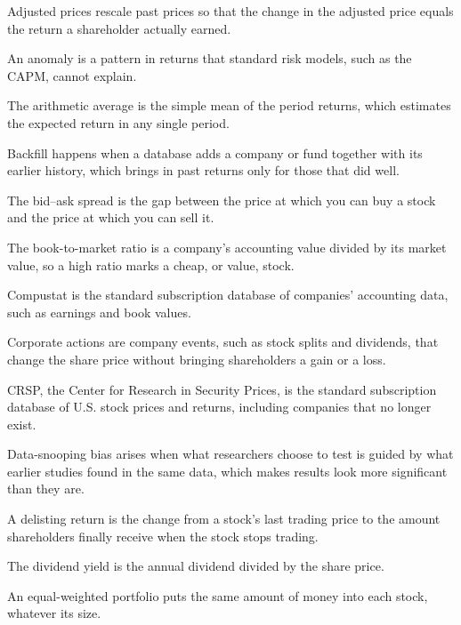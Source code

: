 \begin{keyterms}
\small
\begin{description}[leftmargin=0pt, itemsep=2pt, parsep=0pt, font=\normalfont\bfseries\color{FEMaroon}]
  \item[Adjusted prices.] Adjusted prices rescale past prices so that the change in the adjusted price equals the return a shareholder actually earned.
  \item[Anomaly.] An anomaly is a pattern in returns that standard risk models, such as the CAPM, cannot explain.
  \item[Arithmetic average.] The arithmetic average is the simple mean of the period returns, which estimates the expected return in any single period.
  \item[Backfill.] Backfill happens when a database adds a company or fund together with its earlier history, which brings in past returns only for those that did well.
  \item[Bid--ask spread.] The bid--ask spread is the gap between the price at which you can buy a stock and the price at which you can sell it.
  \item[Book-to-market.] The book-to-market ratio is a company's accounting value divided by its market value, so a high ratio marks a cheap, or value, stock.
  \item[Compustat.] Compustat is the standard subscription database of companies' accounting data, such as earnings and book values.
  \item[Corporate actions.] Corporate actions are company events, such as stock splits and dividends, that change the share price without bringing shareholders a gain or a loss.
  \item[CRSP.] CRSP, the Center for Research in Security Prices, is the standard subscription database of U.S. stock prices and returns, including companies that no longer exist.
  \item[Data-snooping bias.] Data-snooping bias arises when what researchers choose to test is guided by what earlier studies found in the same data, which makes results look more significant than they are.
  \item[Delisting return.] A delisting return is the change from a stock's last trading price to the amount shareholders finally receive when the stock stops trading.
  \item[Dividend yield.] The dividend yield is the annual dividend divided by the share price.
  \item[Equal-weighted.] An equal-weighted portfolio puts the same amount of money into each stock, whatever its size.

\end{description}
\end{keyterms}

